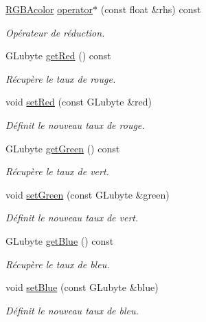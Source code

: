 \begin{DoxyCompactItemize}
\hyperlink{classns_graphics_1_1_r_g_b_acolor}{R\+G\+B\+Acolor} \hyperlink{classns_graphics_1_1_r_g_b_acolor_a1be35bff76dd3859cc714b87db0a1193}{operator$\ast$} (const float \&rhs) const
\begin{DoxyCompactList}\small\item\em Opérateur de réduction. \end{DoxyCompactList}\item 
G\+Lubyte \hyperlink{classns_graphics_1_1_r_g_b_acolor_a55e40085f904b696a0bc63aed6258b79}{get\+Red} () const
\begin{DoxyCompactList}\small\item\em Récupère le taux de rouge. \end{DoxyCompactList}\item 
void \hyperlink{classns_graphics_1_1_r_g_b_acolor_ade94fb53d92392f80a316a2370c8991c}{set\+Red} (const G\+Lubyte \&red)
\begin{DoxyCompactList}\small\item\em Définit le nouveau taux de rouge. \end{DoxyCompactList}\item 
G\+Lubyte \hyperlink{classns_graphics_1_1_r_g_b_acolor_a5f2dc1550c34149fc5cbc1629b54d7e4}{get\+Green} () const
\begin{DoxyCompactList}\small\item\em Récupère le taux de vert. \end{DoxyCompactList}\item 
void \hyperlink{classns_graphics_1_1_r_g_b_acolor_a28674ba0fa5f7abc8afb4023c1d0cf25}{set\+Green} (const G\+Lubyte \&green)
\begin{DoxyCompactList}\small\item\em Définit le nouveau taux de vert. \end{DoxyCompactList}\item 
G\+Lubyte \hyperlink{classns_graphics_1_1_r_g_b_acolor_a9ac0893426cce20a177d6ea7af1d7129}{get\+Blue} () const
\begin{DoxyCompactList}\small\item\em Récupère le taux de bleu. \end{DoxyCompactList}\item 
void \hyperlink{classns_graphics_1_1_r_g_b_acolor_ac6f522de2f51788d98846034174fb16a}{set\+Blue} (const G\+Lubyte \&blue)
\begin{DoxyCompactList}\small\item\em Définit le nouveau taux de bleu. \end{DoxyCompactList}\item 

\end{DoxyCompactItemize}
